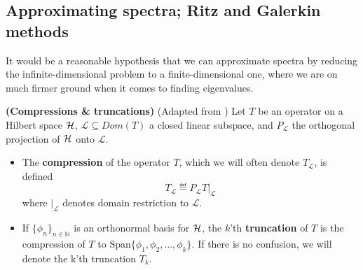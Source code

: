\documentclass[../main.tex]{subfiles}
\begin{document}
\subsection{Approximating spectra; Ritz and Galerkin methods}

It would be a reasonable hypothesis that we can approximate spectra by reducing
the infinite-dimensional problem to a finite-dimensional one, where we are on
much firmer ground when it comes to finding eigenvalues.

\begin{definition}{\textbf{(Compressions \& truncations)}}
(Adapted from \parencite{davies1995spectral})
  Let $T$ be an operator on a Hilbert space $\mathcal{H}$, $\mathcal{L} \subseteq
  Dom(T)$ a closed linear subspace, and $P_\mathcal{L}$ the orthogonal
  projection of $\mathcal{H}$ onto $\mathcal{L}$.
  \begin{itemize}
  \item The \textbf{compression} of the operator $T$, which we will often denote
    $T_\mathcal{L}$, is defined 
      $$T_\mathcal{L} \eqdef P_\mathcal{L} T\big|_{\mathcal{L}}$$
    where $\big|_{\mathcal{L}}$ denotes domain restriction to $\mathcal{L}$. 
  \item If $\{\phi_n\}_{n \in \mathbb{N}}$ is an orthonormal basis
    for $\mathcal{H}$, the $k$'th \textbf{truncation} of $T$ is the compression
    of $T$ to $\text{Span}\{\phi_1, \phi_2, \hdots, \phi_k\}$. If
    there is no confusion, we will denote the k'th truncation $T_k$.
  \end{itemize}
\end{definition}
\end{document}
